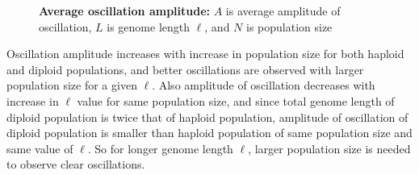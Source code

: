 \begin{figure}[h]
\begin{center}
 \vspace{-0.5em} %

\caption[\textbf{Average oscillation amplitude}]{\textbf{Average oscillation amplitude:} $A$ is average amplitude of oscillation, $L$ is genome length $\ell$, and $N$ is population size}
\label{osc_amp}
\end{center}
\end{figure}

Oscillation amplitude increases with increase in population size for both haploid and diploid populations, 
and better oscillations are observed with larger population size for a given $\ell$. 
Also amplitude of oscillation decreases with increase in $\ell$ value for same population size, 
and since total genome length of diploid population is twice that of haploid population, 
amplitude of oscillation of diploid population is smaller than haploid population of same population size and same value of $\ell$. 
So for longer genome length $\ell$, larger population size is needed to observe clear oscillations.


